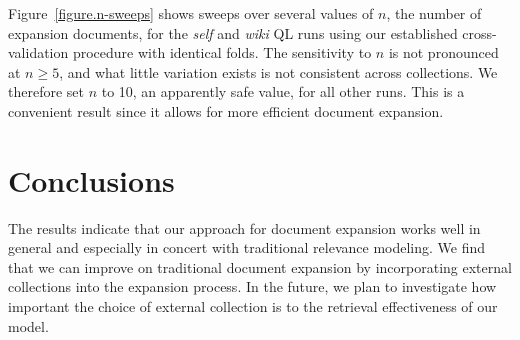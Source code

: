 \documentclass[sigconf]{acmart}
\begin{document}
Figure~\ref{figure.n-sweeps} shows sweeps over several values of $n$, the number of expansion documents, for the \textit{self} and \textit{wiki} QL runs using our established cross-validation procedure with identical folds. The sensitivity to $n$ is not pronounced at $n \geq 5$, and what little variation exists is not consistent across collections. We therefore set $n$ to 10, an apparently safe value, for all other runs. This is a convenient result since it allows for more efficient document expansion.

\section{Conclusions}\label{section.conclusions}

The results indicate that our approach for document expansion works well in general and especially in concert with traditional relevance modeling. We find that we can improve on traditional document expansion by incorporating external collections into the expansion process. In the future, we plan to investigate how important the choice of external collection is to the retrieval effectiveness of our model.





  
\end{document}
